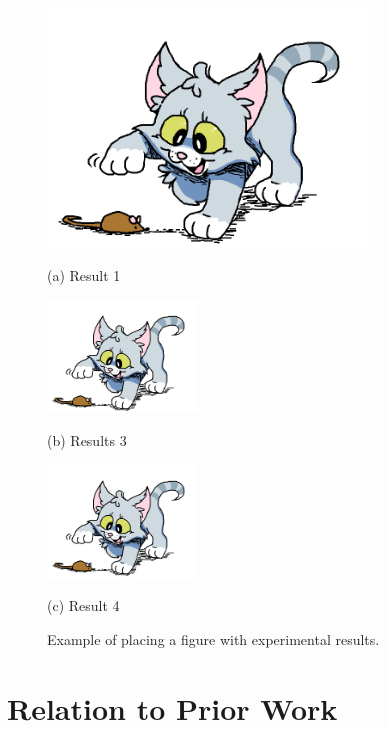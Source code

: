 \documentclass{article}
\begin{document}
\begin{figure}[htb]

\begin{minipage}[b]{1.0\linewidth}
  \centering
  \centerline{\includegraphics[width=8.5cm]{images/cat.png}}
  \centerline{(a) Result 1}\medskip
\end{minipage}
%
\begin{minipage}[b]{.48\linewidth}
  \centering
  \centerline{\includegraphics[width=4.0cm]{images/cat.png}}
  \centerline{(b) Results 3}\medskip
\end{minipage}
\hfill
\begin{minipage}[b]{0.48\linewidth}
  \centering
  \centerline{\includegraphics[width=4.0cm]{images/cat.png}}
  \centerline{(c) Result 4}\medskip
\end{minipage}
%
\caption{Example of placing a figure with experimental results.}
\label{fig:res}
%
\end{figure}



\section{Relation to Prior Work}
\label{sec:prior}
\end{document}
